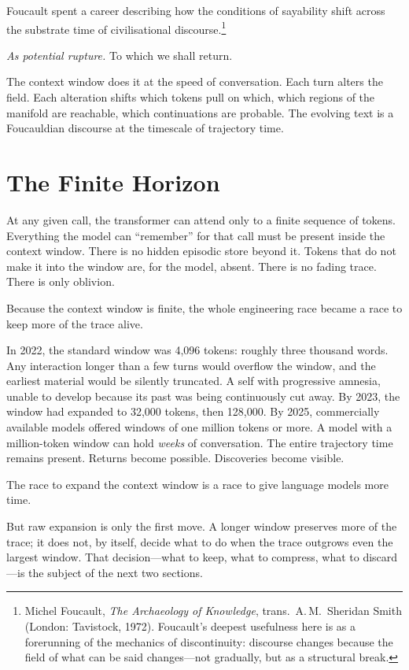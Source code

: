 Foucault spent a career describing how the conditions of sayability shift across the substrate time of civilisational discourse.\footnote{Michel Foucault, \emph{The Archaeology of Knowledge}, trans.\ A.\,M.\ Sheridan Smith (London: Tavistock, 1972). Foucault's deepest usefulness here is as a forerunning of the mechanics of discontinuity: discourse changes because the field of what can be said changes---not gradually, but as a structural break.}

\textit{As potential rupture.} To which we shall return.

The context window does it at the speed of conversation. Each turn alters the field. Each alteration shifts which tokens pull on which, which regions of the manifold are reachable, which continuations are probable. The evolving text is a Foucauldian discourse at the timescale of trajectory time.


\section{The Finite Horizon}

At any given call, the transformer can attend only to a finite sequence of tokens. Everything the model can ``remember'' for that call must be present inside the context window. There is no hidden episodic store beyond it. Tokens that do not make it into the window are, for the model, absent. There is no fading trace. There is only oblivion.

Because the context window is finite, the whole engineering race became a race to keep more of the trace alive.

In 2022, the standard window was 4,096 tokens: roughly three thousand words. Any interaction longer than a few turns would overflow the window, and the earliest material would be silently truncated. A self with progressive amnesia, unable to develop because its past was being continuously cut away. By 2023, the window had expanded to 32,000 tokens, then 128,000. By 2025, commercially available models offered windows of one million tokens or more. A model with a million-token window can hold \emph{weeks} of conversation. The entire trajectory time remains present. Returns become possible. Discoveries become visible.

The race to expand the context window is a race to give language models more time.

But raw expansion is only the first move. A longer window preserves more of the trace; it does not, by itself, decide what to do when the trace outgrows even the largest window. That decision---what to keep, what to compress, what to discard---is the subject of the next two sections.


